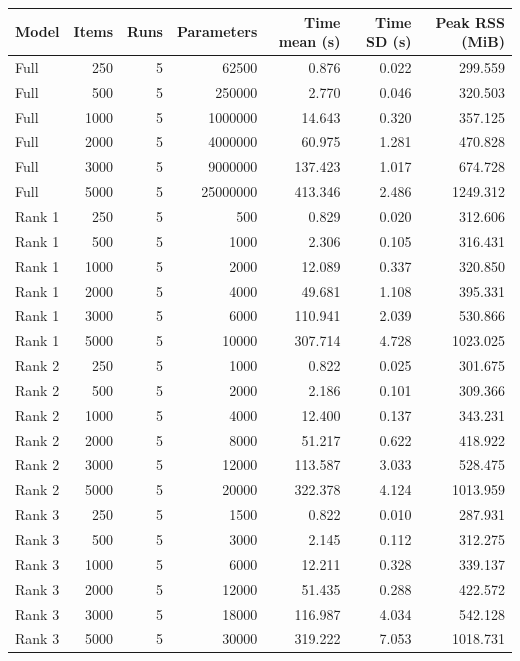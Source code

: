 \begin{tabular}{lrrrrrr}
\toprule
Model & Items & Runs & Parameters & Time mean (s) & Time SD (s) & Peak RSS (MiB) \\
\midrule
Full & 250 & 5 & 62500 & 0.876 & 0.022 & 299.559 \\
Full & 500 & 5 & 250000 & 2.770 & 0.046 & 320.503 \\
Full & 1000 & 5 & 1000000 & 14.643 & 0.320 & 357.125 \\
Full & 2000 & 5 & 4000000 & 60.975 & 1.281 & 470.828 \\
Full & 3000 & 5 & 9000000 & 137.423 & 1.017 & 674.728 \\
Full & 5000 & 5 & 25000000 & 413.346 & 2.486 & 1249.312 \\
Rank 1 & 250 & 5 & 500 & 0.829 & 0.020 & 312.606 \\
Rank 1 & 500 & 5 & 1000 & 2.306 & 0.105 & 316.431 \\
Rank 1 & 1000 & 5 & 2000 & 12.089 & 0.337 & 320.850 \\
Rank 1 & 2000 & 5 & 4000 & 49.681 & 1.108 & 395.331 \\
Rank 1 & 3000 & 5 & 6000 & 110.941 & 2.039 & 530.866 \\
Rank 1 & 5000 & 5 & 10000 & 307.714 & 4.728 & 1023.025 \\
Rank 2 & 250 & 5 & 1000 & 0.822 & 0.025 & 301.675 \\
Rank 2 & 500 & 5 & 2000 & 2.186 & 0.101 & 309.366 \\
Rank 2 & 1000 & 5 & 4000 & 12.400 & 0.137 & 343.231 \\
Rank 2 & 2000 & 5 & 8000 & 51.217 & 0.622 & 418.922 \\
Rank 2 & 3000 & 5 & 12000 & 113.587 & 3.033 & 528.475 \\
Rank 2 & 5000 & 5 & 20000 & 322.378 & 4.124 & 1013.959 \\
Rank 3 & 250 & 5 & 1500 & 0.822 & 0.010 & 287.931 \\
Rank 3 & 500 & 5 & 3000 & 2.145 & 0.112 & 312.275 \\
Rank 3 & 1000 & 5 & 6000 & 12.211 & 0.328 & 339.137 \\
Rank 3 & 2000 & 5 & 12000 & 51.435 & 0.288 & 422.572 \\
Rank 3 & 3000 & 5 & 18000 & 116.987 & 4.034 & 542.128 \\
Rank 3 & 5000 & 5 & 30000 & 319.222 & 7.053 & 1018.731 \\
\bottomrule
\end{tabular}
